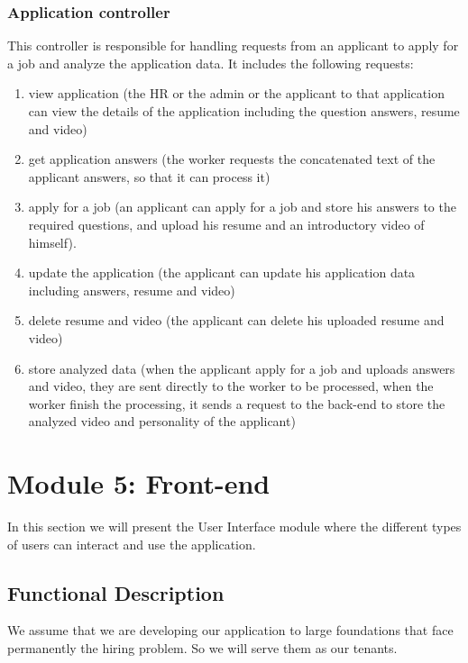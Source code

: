 \subsubsection{Application controller}
This controller is responsible for handling requests from an applicant to apply for a job and analyze the application data.
It includes the following requests:
\begin{enumerate}
    \item view application (the HR or the admin or the applicant to that application can view the details of the application including the question answers, resume and video)
    \item get application answers (the worker requests the concatenated text of the applicant answers, so that it can process it)
    \item apply for a job (an applicant can apply for a job and store his answers to the required questions, and upload his resume and an introductory video of himself).
    \item update the application (the applicant can update his application data including answers, resume and video)
    \item delete resume and video (the applicant can delete his uploaded resume and video)
    \item store analyzed data (when the applicant apply for a job and uploads answers and video, they are sent directly to the worker to be processed, when the worker finish the processing, it sends a request to the back-end to store the analyzed video and personality of the applicant)
\end{enumerate}


\newpage

\section{Module 5: Front-end}
\label{sec:module_5}

In this section we will present the User Interface module where the different types of users can interact and use the application. 

\subsection{Functional Description}
\label{sec:module_5_func_description}

We assume that we are developing our application to large foundations that face permanently the hiring problem. So we will serve them as our tenants.

